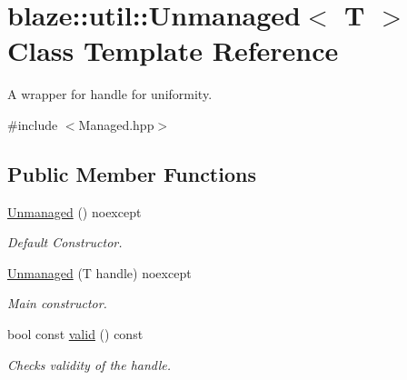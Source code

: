 \hypertarget{classblaze_1_1util_1_1Unmanaged}{}\section{blaze\+:\+:util\+:\+:Unmanaged$<$ T $>$ Class Template Reference}
\label{classblaze_1_1util_1_1Unmanaged}


A wrapper for handle for uniformity.  




{\ttfamily \#include $<$Managed.\+hpp$>$}

\subsection*{Public Member Functions}
\begin{DoxyCompactItemize}
\item 
\mbox{\label{classblaze_1_1util_1_1Unmanaged_a5d9bf18bd244088eacfbd9222ffe4443}} 
\hyperlink{classblaze_1_1util_1_1Unmanaged_a5d9bf18bd244088eacfbd9222ffe4443}{Unmanaged} () noexcept
\begin{DoxyCompactList}\small\item\em Default Constructor. \end{DoxyCompactList}\item 
\hyperlink{classblaze_1_1util_1_1Unmanaged_a1cd09eebfad8e92f75798127fb783f9d}{Unmanaged} (T handle) noexcept
\begin{DoxyCompactList}\small\item\em Main constructor. \end{DoxyCompactList}\item 
bool const \hyperlink{classblaze_1_1util_1_1Unmanaged_a945a30c97396b358cf250025520e9dbc}{valid} () const
\begin{DoxyCompactList}\small\item\em Checks validity of the handle. \end{DoxyCompactList}\end{DoxyCompactItemize}

